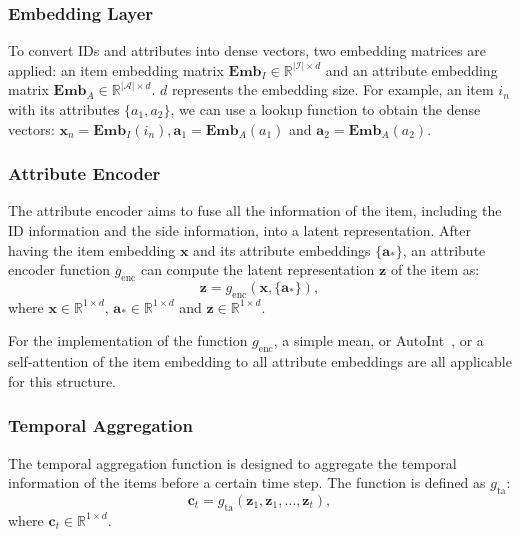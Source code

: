 \documentclass[conference]{IEEEtran}
\begin{document}
\subsubsection{Embedding Layer}
\label{sec:emblay}
To convert IDs and attributes into dense vectors, two embedding matrices are applied: an item embedding matrix $\mathbf{Emb}_{I} \in \mathbb{R}^{|\mathcal{I}| \times d}$ and an attribute embedding matrix $\mathbf{Emb}_{A} \in \mathbb{R}^{|\mathcal{A}| \times d}$. $d$ represents the embedding size. For example, an item $i_n$ with its attributes $\{a_1,a_2\}$, we can use a lookup function to obtain the dense vectors: $\mathbf{x}_n=\mathbf{Emb}_{I}(i_n),\mathbf{a}_1=\mathbf{Emb}_{A}(a_1)$ and $\mathbf{a}_2=\mathbf{Emb}_{A}(a_2)$.

\subsubsection{Attribute Encoder}
\label{sec:attenc}
The attribute encoder aims to fuse all the information of the item, including the ID information and the side information, into a latent representation. After having the item embedding $\mathbf{x}$ and its attribute embeddings $\{\mathbf{a}_*\}$, an attribute encoder function $g_\text{enc}$ can compute the latent representation $\mathbf{z}$ of the item as:
\begin{equation}
    \mathbf{z}=g_\text{enc}(\mathbf{x},\{\mathbf{a}_*\}),
\end{equation}
where $\mathbf{x}\in\mathbb{R}^{1\times d}$, $\mathbf{a}_*\in\mathbb{R}^{1\times d}$ and $\mathbf{z}\in\mathbb{R}^{1\times d}$.

For the implementation of the function $g_\text{enc}$, a simple mean, or AutoInt~\cite{autoint}, or a self-attention of the item embedding to all attribute embeddings are all applicable for this structure.

\subsubsection{Temporal Aggregation}
\label{sec:temagg}
The temporal aggregation function is designed to aggregate the temporal information of the items before a certain time step. The function is defined as $g_\text{ta}$:
\begin{equation}
    \mathbf{c}_t=g_\text{ta}(\mathbf{z}_1,\mathbf{z}_1,\ldots,\mathbf{z}_t),
\end{equation}
where $\mathbf{c}_t\in\mathbb{R}^{1\times d}$.
\end{document}

